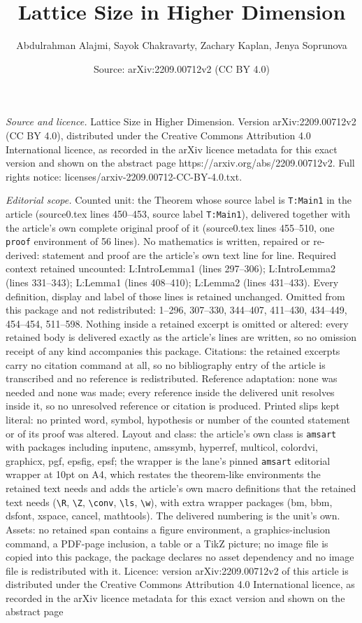 \documentclass[10pt,a4paper]{amsart}
\title[Lattice Size in Higher Dimension]{Lattice Size in Higher Dimension}
\author{Abdulrahman Alajmi, Sayok Chakravarty, Zachary Kaplan, Jenya Soprunova}
\date{Source: arXiv:2209.00712v2 (CC BY 4.0)}
\begin{document}
\maketitle

\noindent\emph{Source and licence.} Lattice Size in Higher Dimension. Version arXiv:2209.00712v2 (CC BY 4.0), distributed under the Creative Commons Attribution 4.0 International licence, as recorded in the arXiv licence metadata for this exact version and shown on the abstract page https://arxiv.org/abs/2209.00712v2. Full rights notice: licenses/arxiv-2209.00712-CC-BY-4.0.txt.\par\smallskip

\noindent\textit{Editorial scope.} Counted unit: the Theorem whose source label is \texttt{T:Main1} in the article (source0.tex lines 450--453, source label \texttt{T:Main1}), delivered together with the article's own complete original proof of it (source0.tex lines 455--510, one \texttt{proof} environment of 56 lines). No mathematics is written, repaired or re-derived: statement and proof are the article's own text line for line. Required context retained uncounted: L:IntroLemma1 (lines 297--306); L:IntroLemma2 (lines 331--343); L:Lemma1 (lines 408--410); L:Lemma2 (lines 431--433). Every definition, display and label of those lines is retained unchanged. Omitted from this package and not redistributed: 1--296, 307--330, 344--407, 411--430, 434--449, 454--454, 511--598. Nothing inside a retained excerpt is omitted or altered: every retained body is delivered exactly as the article's lines are written, so no omission receipt of any kind accompanies this package. Citations: the retained excerpts carry no citation command at all, so no bibliography entry of the article is transcribed and no reference is redistributed. Reference adaptation: none was needed and none was made; every reference inside the delivered unit resolves inside it, so no unresolved reference or citation is produced. Printed slips kept literal: no printed word, symbol, hypothesis or number of the counted statement or of its proof was altered. Layout and class: the article's own class is \texttt{amsart} with packages including inputenc, amssymb, hyperref, multicol, colordvi, graphicx, pgf, epsfig, epsf; the wrapper is the lane's pinned \texttt{amsart} editorial wrapper at 10pt on A4, which restates the theorem-like environments the retained text needs and adds the article's own macro definitions that the retained text needs (\texttt{\textbackslash R}, \texttt{\textbackslash Z}, \texttt{\textbackslash conv}, \texttt{\textbackslash ls}, \texttt{\textbackslash w}), with extra wrapper packages (bm, bbm, dsfont, xspace, cancel, mathtools). The delivered numbering is the unit's own. Assets: no retained span contains a figure environment, a graphics-inclusion command, a PDF-page inclusion, a table or a TikZ picture; no image file is copied into this package, the package declares no asset dependency and no image file is redistributed with it. Licence: version arXiv:2209.00712v2 of this article is distributed under the Creative Commons Attribution 4.0 International licence, as recorded in the arXiv licence metadata for this exact version and shown on the abstract page 
\end{document}
